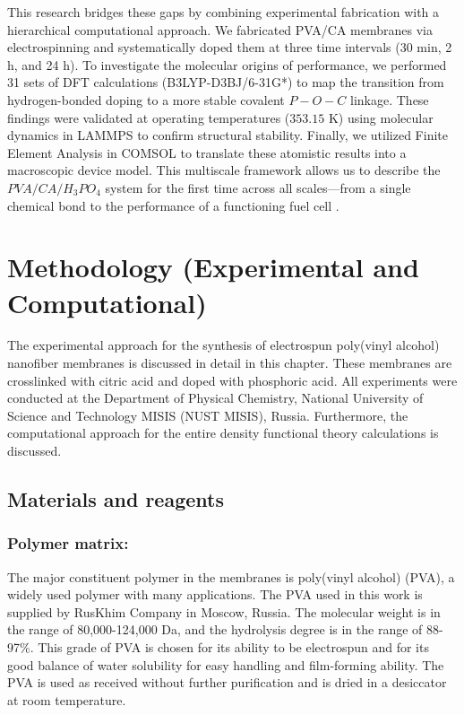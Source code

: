 \documentclass[12pt,a4paper]{report}
\begin{document}
This research bridges these gaps by combining experimental fabrication with a hierarchical computational approach. We fabricated PVA/CA membranes via electrospinning and systematically doped them at three time intervals (30 min, 2 h, and 24 h). To investigate the molecular origins of performance, we performed 31 sets of DFT calculations (B3LYP-D3BJ/6-31G*) to map the transition from hydrogen-bonded doping to a more stable covalent $P-O-C$ linkage. These findings were validated at operating temperatures ($353.15$ K) using molecular dynamics in LAMMPS to confirm structural stability. Finally, we utilized Finite Element Analysis in COMSOL to translate these atomistic results into a macroscopic device model. This multiscale framework allows us to describe the $PVA/CA/H_3PO_4$ system for the first time across all scales—from a single chemical bond to the performance of a functioning fuel cell \cite{21,79}.


\chapter{Methodology (Experimental and Computational)}

The experimental approach for the synthesis of electrospun poly(vinyl alcohol) nanofiber membranes is discussed in detail in this chapter. These membranes are crosslinked with citric acid and doped with phosphoric acid. All experiments were conducted at the Department of Physical Chemistry, National University of Science and Technology MISIS (NUST MISIS), Russia. Furthermore, the computational approach for the entire density functional theory calculations is discussed.

\section{Materials and reagents}
\subsection{Polymer matrix:}
The major constituent polymer in the membranes is poly(vinyl alcohol) (PVA), a widely used polymer with many applications. The PVA used in this work is supplied by RusKhim Company in Moscow, Russia. The molecular weight is in the range of 80,000-124,000 Da, and the hydrolysis degree is in the range of 88-97\%. This grade of PVA is chosen for its ability to be electrospun and for its good balance of water solubility\cite{10,11} for easy handling and film-forming ability.\cite{44,45} The PVA is used as received without further purification and is dried in a desiccator at room temperature.
\end{document}

